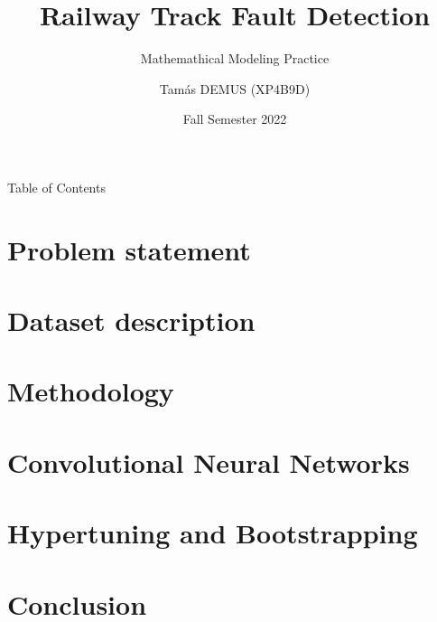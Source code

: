 \documentclass[aspectratio=169]{beamer}
\title{Railway Track Fault Detection}
\subtitle{Mathemathical Modeling Practice}
\author{Tamás DEMUS (XP4B9D)}
\date{Fall Semester 2022}
\begin{document}
\maketitle

\begin{frame}{Table of Contents}
    \tableofcontents
\end{frame}

\section{Problem statement}
\begin{frame}

\end{frame}

\section{Dataset description}
\begin{frame}

\end{frame}

\section{Methodology}
\begin{frame}

\end{frame}

\section{Convolutional Neural Networks}
\begin{frame}

\end{frame}

\section{Hypertuning and Bootstrapping}
\begin{frame}

\end{frame}

\section{Conclusion}
\begin{frame}

\end{frame}
\end{document}

